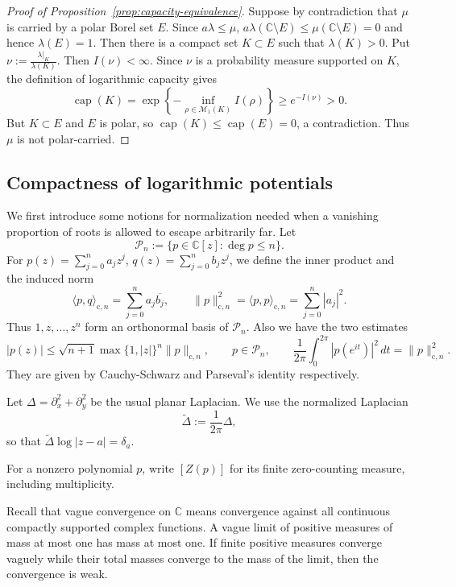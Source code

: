 \documentclass[10pt,reqno]{amsart}
\theoremstyle{remark}
\newcommand{\C}{\mathbb C}
\begin{document}
\begin{proof}[Proof of Proposition~\ref{prop:capacity-equivalence}]
Suppose by contradiction that $\mu$ is carried by a polar Borel set $E$. Since $a\lambda\le\mu$, $a\lambda(\C\setminus E)\le\mu(\C\setminus E)=0$ and hence $\lambda(E)=1$. Then there is a compact set $K\subset E$ such that $\lambda(K)>0$. Put $\nu:=\frac{\lambda|_K}{\lambda(K)}$. Then $I(\nu)<\infty$. Since $\nu$ is a probability measure supported on $K$, the definition of logarithmic capacity gives
\[\operatorname{cap}(K)
=\exp\left\{-\inf_{\rho\in\mathcal M_1(K)}I(\rho)\right\}
\ge e^{-I(\nu)}>0.\]
But $K\subset E$ and $E$ is polar, so $\operatorname{cap}(K)\le\operatorname{cap}(E)=0$, a contradiction. Thus $\mu$ is not polar-carried.


\end{proof}

\subsection{Compactness of logarithmic potentials}
We first introduce some notions for normalization needed when a vanishing proportion of roots is allowed to escape arbitrarily far. Let 
\[\mathcal{P}_n:=\{p\in \C[z]:\deg p\le n\}.\]
For $p(z)=\sum_{j=0}^n a_jz^j$, $q(z)=\sum_{j=0}^n b_j z^j$, we define the inner product and the induced norm
\[\langle p,q\rangle_{\mathrm{c},n}=\sum_{j=0}^n a_j\overline{b_j},\qquad
\|p\|_{\mathrm{c},n}^2=\langle p,p\rangle_{\mathrm{c},n}=\sum_{j=0}^n |a_j|^2.\]
Thus $1,z,\ldots, z^n$ form an orthonormal basis of $\mathcal{P}_n$. 
Also we have the two estimates
\begin{equation}\label{eq:estimate}
    |p(z)|\le \sqrt{n+1}\max\{1,|z|\}^n\|p\|_{\mathrm{c},n},\qquad p\in\mathcal{P}_n,\qquad \frac{1}{2\pi}\int_0^{2\pi}|p(e^{it})|^2\,dt=\|p\|_{\mathrm{c},n}^2.
\end{equation} They are given by Cauchy-Schwarz and Parseval's identity respectively.

Let $\Delta=\partial_x^2+\partial_y^2$ be the usual planar Laplacian. We use the normalized Laplacian
\[\widetilde{\Delta}:=\frac{1}{2\pi}\Delta,\]
so that $\widetilde{\Delta}\log|z-a|=\delta_a$.

For a nonzero polynomial $p$, write $[Z(p)]$ for its finite zero-counting measure, including multiplicity. 

Recall that vague convergence on $\C$ means convergence against all continuous compactly supported complex functions. A vague limit of positive measures of mass at most one has mass at most one. If finite positive measures converge vaguely while their total masses converge to the mass of the limit, then the convergence is weak.
\end{document}
